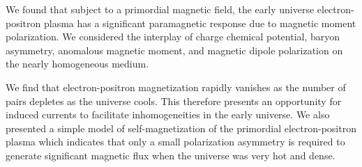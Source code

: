 We found that subject to a primordial magnetic field, the early universe electron-positron plasma has a significant paramagnetic response due to magnetic moment polarization. We considered the interplay of charge chemical potential, baryon asymmetry, anomalous magnetic moment, and magnetic dipole polarization on the nearly homogeneous medium.

We find that electron-positron magnetization rapidly vanishes as the number of pairs depletes as the universe cools. This therefore presents an opportunity for induced currents to facilitate inhomogeneities in the early universe. We also presented a simple model of self-magnetization of the primordial electron-positron plasma which indicates that only a small polarization asymmetry is required to generate significant magnetic flux when the universe was very hot and dense.
